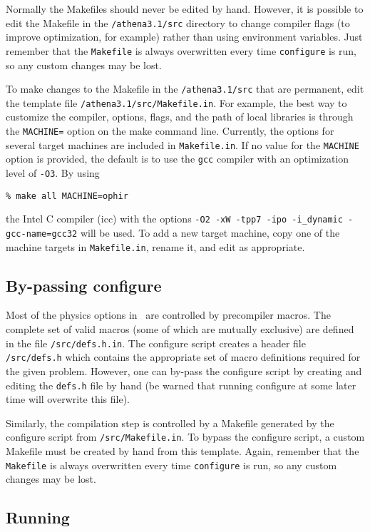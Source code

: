 Normally the Makefiles should never be edited by hand.  However,
it is possible to edit the Makefile in the {\tt /athena3.1/src} directory to
change compiler flags (to improve optimization, for example)
rather than using
environment variables.  Just remember that the {\tt Makefile} is always 
overwritten every time {\tt configure} is run, so any custom changes may be
lost.

To make changes to the Makefile in the {\tt /athena3.1/src} that are permanent,
edit the template file {\tt /athena3.1/src/Makefile.in}.
For example, the best way to customize the compiler, options, flags,
and the path of local libraries is through the {\tt MACHINE=} option
on the make command line.  Currently, the options for several target machines are
included in {\tt Makefile.in}.  If no value for the {\tt MACHINE} option is
provided, the default is to use the {\tt gcc} compiler
with an optimization level of {\tt -O3}.  By using
\begin{verbatim}
% make all MACHINE=ophir
\end{verbatim}
the Intel C compiler (icc) with the options
{\tt -O2 -xW -tpp7 -ipo -i\_dynamic -gcc-name=gcc32} will be used.  To add
a new target machine, copy one of the machine targets in {\tt Makefile.in},
rename it, and edit as appropriate. 

\subsection{By-passing configure}

Most of the physics options in \ath\ are controlled by precompiler macros.  The
complete set of valid macros (some of which are mutually exclusive) are
defined in the file {\tt /src/defs.h.in}.  
The configure script creates a header file {\tt /src/defs.h} which contains
the appropriate set of macro definitions required for the given problem.
However, one can by-pass the configure script by creating and editing the
{\tt defs.h} file by hand (be warned that running configure at some later time
will overwrite this file).

Similarly, the compilation step is controlled by a Makefile generated by
the configure script from {\tt /src/Makefile.in}.  To bypass the configure
script, a custom Makefile must be created by hand from this template.
Again, remember that the {\tt Makefile} is always
overwritten every time {\tt configure} is run, so any custom changes may be
lost.

\subsection{Running \ath}


